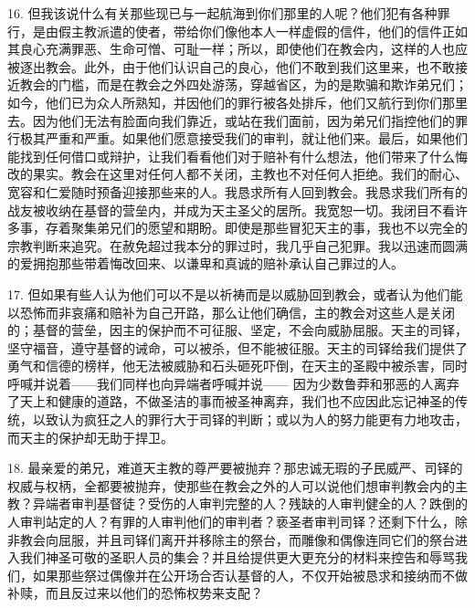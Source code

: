 16. 但我该说什么有关那些现已与一起航海到你们那里的人呢？他们犯有各种罪行，是由假主教派遣的使者，带给你们像他本人一样虚假的信件，他们的信件正如其良心充满罪恶、生命可憎、可耻一样；所以，即使他们在教会内，这样的人也应被逐出教会。此外，由于他们认识自己的良心，他们不敢到我们这里来，也不敢接近教会的门槛，而是在教会之外四处游荡，穿越省区，为的是欺骗和欺诈弟兄们；如今，他们已为众人所熟知，并因他们的罪行被各处排斥，他们又航行到你们那里去。因为他们无法有脸面向我们靠近，或站在我们面前，因为弟兄们指控他们的罪行极其严重和严重。如果他们愿意接受我们的审判，就让他们来。最后，如果他们能找到任何借口或辩护，让我们看看他们对于赔补有什么想法，他们带来了什么悔改的果实。教会在这里对任何人都不关闭，主教也不对任何人拒绝。我们的耐心、宽容和仁爱随时预备迎接那些来的人。我恳求所有人回到教会。我恳求我们所有的战友被收纳在基督的营垒内，并成为天主圣父的居所。我宽恕一切。我闭目不看许多事，存着聚集弟兄们的愿望和期盼。即使是那些冒犯天主的事，我也不以完全的宗教判断来追究。在赦免超过我本分的罪过时，我几乎自己犯罪。我以迅速而圆满的爱拥抱那些带着悔改回来、以谦卑和真诚的赔补承认自己罪过的人。\par

17. 但如果有些人认为他们可以不是以祈祷而是以威胁回到教会，或者认为他们能以恐怖而非哀痛和赔补为自己开路，那么让他们确信，主的教会对这些人是关闭的；基督的营垒，因主的保护而不可征服、坚定，不会向威胁屈服。天主的司铎，坚守福音，遵守基督的诫命，可以被杀，但不能被征服。天主的司铎给我们提供了勇气和信德的榜样，他无法被威胁和石头砸死吓倒，在天主的圣殿中被杀害，同时呼喊并说着——我们同样也向异端者呼喊并说—— 因为少数鲁莽和邪恶的人离弃了天上和健康的道路，不做圣洁的事而被圣神离弃，我们也不应因此忘记神圣的传统，以致认为疯狂之人的罪行大于司铎的判断；或以为人的努力能更有力地攻击，而天主的保护却无助于捍卫。\par

18. 最亲爱的弟兄，难道天主教的尊严要被抛弃？那忠诚无瑕的子民威严、司铎的权威与权柄，全都要被抛弃，使那些在教会之外的人可以说他们想审判教会内的主教？异端者审判基督徒？受伤的人审判完整的人？残缺的人审判健全的人？跌倒的人审判站定的人？有罪的人审判他们的审判者？亵圣者审判司铎？还剩下什么，除非教会向屈服，并且司铎们离开并移除主的祭台，而雕像和偶像连同它们的祭台进入我们神圣可敬的圣职人员的集会？并且给提供更大更充分的材料来控告和辱骂我们，如果那些祭过偶像并在公开场合否认基督的人，不仅开始被恳求和接纳而不做补赎，而且反过来以他们的恐怖权势来支配？\par

